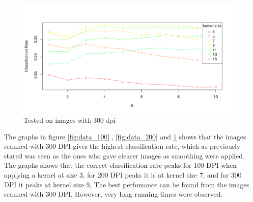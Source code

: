 \begin{figure}[H]
	\centering
		\includegraphics[width = \textwidth]{Figure/data_300_15_10.png}
		\caption{Tested on images with 300 dpi}
		\label{fig:data_300}
\end{figure}

The graphs in figure \ref{fig:data_100} , \ref{fig:data_200}  and \ref{fig:data_300} 
 shows that the images scanned with 300 DPI gives the highest classification rate,
which as previously stated was seen as the ones who gave clearer images as smoothing were applied.
 The graphs shows that the correct classification rate peaks for 100 DPI when applying a kernel at size 3,
 for 200 DPI peaks it is at kernel size 7, and for 300 DPI it peaks at kernel size 9,
 The best perfomance can be found from the images scanned with 300 DPI.
However, very long running times were observed.

